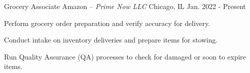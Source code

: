


\begin{cventries}


\cventry
{Grocery Associate} %
{Amazon \textmd{-- \em{Prime Now LLC}}} %
{Chicago, IL} %
{Jan. 2022 - Present} %
{ %
\begin{cvitems}
\item {Perform grocery order preparation and verify accuracy for delivery.}
\item {Conduct intake on inventory deliveries and prepare items for stowing.}
\item {Run Quality Assurance (QA) processes to check for damaged or soon to expire items.}
\end{cvitems}
}



\end{cventries}
